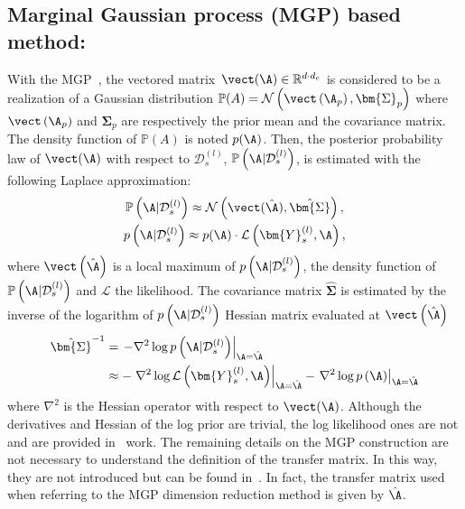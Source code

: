 \subsection{Marginal Gaussian process (MGP) based method:}

With the MGP~\cite{GarnettActiveLearningLinear2014}, the vectored  matrix\ $\vect(\A) \in \mathbb{R}^{d \cdot d_e}$ is considered to be a realization of a Gaussian distribution \linebreak \mbox{$\mathbb{P}(A) = \mathcal{N}\left(\vect\left(\A_p\right), \bm{\Sigma}_p \right)$} where $\vect\left(\A_p\right)$ and $\bm{\Sigma}_p$ are respectively the prior mean and the covariance matrix.
The density function of $\mathbb{P}(A)$ is noted $p(\A)$.
Then, the posterior probability law of $\vect(\A)$ with respect to $\mathcal{D}_s^{(l)}$, $\mathbb{P}\left(\A | \mathcal{D}_s^{(l)}\right)$, is estimated with the following Laplace approximation:
\begin{gather}
   \mathbb{P}\left(\A | \mathcal{D}_s^{(l)}\right) \approx \mathcal{N}\left( \vect(\hat{\A}), \hat{\bm{\Sigma}} \right), \label{eq:mat_distrib} \\
    p\left(\A | \mathcal{D}_s^{(l)}\right) \approx p(\A) \cdot \mathcal{L}\left(\bm{Y}_s^{(l)},\A\right),
\end{gather}
where $\vect\left(\hat{\A}\right)$ is a local maximum of $p\left(\A | \mathcal{D}_s^{(l)}\right)$, the density function of $\mathbb{P}\left(\A | \mathcal{D}_s^{(l)}\right)$ and $\mathcal{L}$ the likelihood.
The covariance matrix $\hat{\bm{\Sigma}}$ is estimated by the inverse of the logarithm of $p\left(\A | \mathcal{D}_s^{(l)}\right)$ Hessian  matrix evaluated at $\vect\left(\hat{\A}\right)$
\begin{equation}
    \begin{split}
            \hat{\bm{\Sigma}}^{-1} & = \left.- \nabla^2 \log p\left(\A | \mathcal{D}_s^{(l)}\right)\right|_{\A=\hat{\A}} \\
             & \approx - \left. \nabla^2 \log \mathcal{L}\left(\bm{Y}_s^{(l)},\A\right) \right|_{\A=\hat{\A}} - \left. \nabla^2 \log p\left(\A\right) \right|_{\A=\hat{\A}}
    \end{split}
    \label{eq:sigma_gmp}
\end{equation}
where $\nabla^2$ is the Hessian operator with respect to $\vect(\A)$.
Although the derivatives and Hessian of the log prior are trivial, the log likelihood ones are not and are provided in~\citet{GarnettActiveLearningLinear2014} work.
The remaining details on the MGP construction are not necessary to understand the definition of the transfer matrix.
In this way, they are not introduced but can be found in~\citet{GarnettActiveLearningLinear2014}. 
In fact, the transfer matrix used when referring to the MGP dimension reduction method is given by $\hat{\A}$.